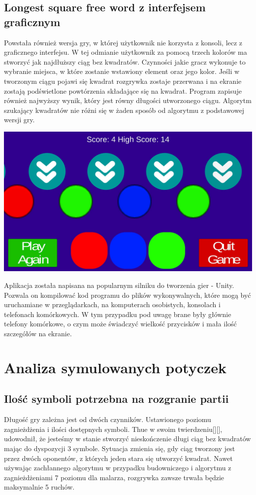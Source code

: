 \documentclass[document]{xmgr}
\begin{document}
\section{Longest square free word z interfejsem graficznym}
Powstała również wersja gry, w której użytkownik nie korzysta z konsoli, lecz z graficznego interfejsu. W tej odmianie użytkownik za pomocą trzech kolorów ma stworzyć jak najdłuższy ciąg bez kwadratów. Czynności jakie gracz wykonuje to wybranie miejsca, w które zostanie wstawiony element oraz jego kolor. Jeśli w tworzonym ciągu pojawi się kwadrat rozgrywka zostaje przerwana i na ekranie zostają podświetlone powtórzenia składające się na kwadrat. Program zapisuje również najwyższy wynik, który jest równy długości utworzonego ciągu. Algorytm szukający kwadratów nie różni się w żaden sposób od algorytmu z podstawowej wersji gry.

\begin{center}
\includegraphics[scale = 0.2]{images/thueMobile}
\end{center}

Aplikacja została napisana na popularnym silniku do tworzenia gier - Unity. Pozwala on kompilować kod programu do plików wykonywalnych, które mogą być uruchamiane w przeglądarkach, na komputerach osobistych, konsolach i telefonach komórkowych. W tym przypadku pod uwagę brane były głównie telefony komórkowe, o czym może świadczyć wielkość przycisków i mała ilość szczegółów na ekranie.


\chapter{Analiza symulowanych potyczek} 

\section{Ilość symboli potrzebna na rozgranie partii}
Długość gry zależna jest od dwóch czynników. Ustawionego poziomu zagnieżdżenia i ilości dostępnych symboli. Thue w swoim twierdzeniu[][], udowodnił, że jesteśmy w stanie stworzyć nieskończenie długi ciąg bez kwadratów mając do dyspozycji 3 symbole. Sytuacja zmienia się, gdy ciąg tworzony jest przez dwóch oponentów, z których jeden stara się utworzyć kwadrat. Nawet używając zachłannego algorytmu w przypadku budowniczego i algorytmu z zagnieżdżeniami 7 poziomu dla malarza, rozgrywka zawsze trwała będzie maksymalnie 5 ruchów. 
\end{document}
